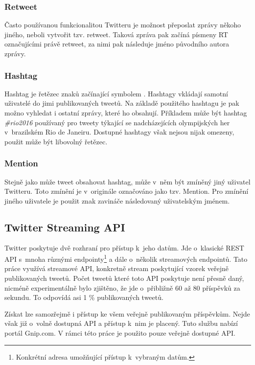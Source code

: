 \documentclass[thesis=B,czech]{FITthesis}[2012/06/26]
\begin{document}
\subsubsection{Retweet}

	Často používanou funkcionalitou Twitteru je možnost přeposlat zprávy někoho jiného, neboli vytvořit tzv. retweet. Taková zpráva pak začíná písmeny RT označujícími právě retweet, za nimi pak následuje jméno původního autora zprávy. 


\subsubsection{Hashtag}

	Hashtag je řetězec znaků začínající symbolem \uv{\#}. Hashtagy vkládají samotní uživatelé do jimi publikovaných tweetů. Na základě použitého hashtagu je pak možno vyhledat i ostatní zprávy, které ho obsahují. Příkladem může být hashtag \textit{\#rio2016} používaný pro tweety týkající se nadcházejících olympijských her v~brazilském Rio de Janeiru. Dostupné hashtagy však nejsou nijak omezeny, použit může být libovolný řetězec. 


\subsubsection{Mention}

	Stejně jako může tweet obsahovat hashtag, může v~něm být zmíněný jiný uživatel Twitteru. Toto zmínění je v~originále označováno jako tzv. Mention. Pro zmínění jiného uživatele je použit znak zavináče následovaný uživatelským jménem. 


\subsection{Twitter Streaming API}
\label{twitter-api}
	Twitter poskytuje dvě rozhraní pro přístup k~jeho datům. Jde o~klasické REST API s~mnoha různými endpointy\footnote{Konkrétní adresa umožňující přístup k~vybraným datům.} a dále o~několik streamových endpointů. Tato práce využívá streamové API, konkretně stream poskytující vzorek veřejně publikovaných tweetů\cite{twitter-api}. Počet tweetů které toto API poskytuje není přesně daný, nicméně experimentálně bylo zjištěno, že jde o~přibližně 60 až 80 příspěvků za sekundu. To odpovídá asi 1 \% publikovaných tweetů. 
	
	Získat lze samozřejmě i přístup ke všem veřejně publikovaným příspěvkům. Nejde však již o~volně dostupná API a přístup k~nim je placený. Tuto službu nabízí portál Gnip.com\cite{gnip}. V rámci této práce je použito pouze veřejně dostupné API. 
	
\end{document}
